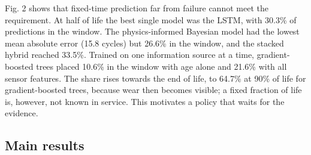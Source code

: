 \documentclass[a4paper,fleqn,doubleblind]{cas-dc}
\begin{document}
Fig. 2 shows that fixed-time prediction far from failure cannot meet the requirement. At half of life the best single model was the LSTM, with 30.3\% of predictions in the window. The physics-informed Bayesian model had the lowest mean absolute error (15.8 cycles) but 26.6\% in the window, and the stacked hybrid reached 33.5\%. Trained on one information source at a time, gradient-boosted trees placed 10.6\% in the window with age alone and 21.6\% with all sensor features. The share rises towards the end of life, to 64.7\% at 90\% of life for gradient-boosted trees, because wear then becomes visible; a fixed fraction of life is, however, not known in service. This motivates a policy that waits for the evidence.

\subsection{Main results}
\end{document}
